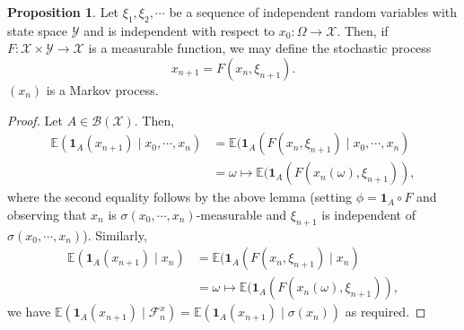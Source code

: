 \documentclass[]{article}
\theoremstyle{definition}
\theoremstyle{definition}
\newtheorem{proposition}{Proposition}[section]
\begin{document}
\begin{proposition}
  Let \(\xi_1, \xi_2, \cdots\) be a sequence of independent random variables with 
  state space \(\mathcal{Y}\) and is independent with respect to 
  \(x_0 : \Omega \to \mathcal{X}\). Then, if \(F : \mathcal{X} \times \mathcal{Y} \to \mathcal{X}\) 
  is a measurable function, we may define the stochastic process 
  \[x_{n + 1} = F(x_n, \xi_{n + 1}).\]
  \((x_n)\) is a Markov process. 
\end{proposition}
\begin{proof}
  Let \(A \in \mathcal{B}(\mathcal{X})\). Then, 
  \[\begin{split}
    \mathbb{E}(\mathbf{1}_A(x_{n + 1}) \mid x_0, \cdots, x_n) 
    & = \mathbb{E}(\mathbf{1}_A(F(x_n, \xi_{n + 1}) \mid x_0, \cdots, x_n) \\
    & = \omega \mapsto \mathbb{E}(\mathbf{1}_A(F(x_n(\omega), \xi_{n + 1})),
  \end{split}\]
  where the second equality follows by the above lemma (setting \(\phi = \mathbf{1}_A \circ F\) 
  and observing that \(x_n\) is \(\sigma(x_0, \cdots, x_n)\)-measurable and 
  \(\xi_{n + 1}\) is independent of \(\sigma(x_0, \cdots, x_n)\)). Similarly, 
  \[\begin{split}
    \mathbb{E}(\mathbf{1}_A(x_{n + 1}) \mid x_n) 
    & = \mathbb{E}(\mathbf{1}_A(F(x_n, \xi_{n + 1}) \mid x_n) \\
    & = \omega \mapsto \mathbb{E}(\mathbf{1}_A(F(x_n(\omega), \xi_{n + 1})),
  \end{split}\]
  we have \(\mathbb{E}(\mathbf{1}_A(x_{n + 1}) \mid \mathcal{F}^x_n) = 
  \mathbb{E}(\mathbf{1}_A(x_{n + 1}) \mid \sigma(x_n))\) as required.
\end{proof}
\end{document}
